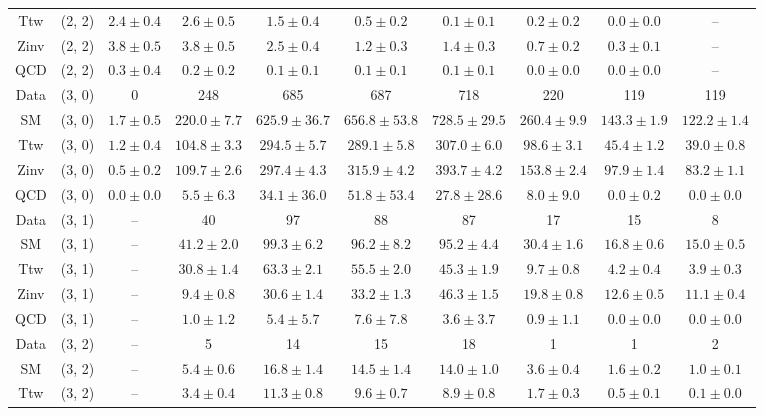 \begin{table}[h!]
{\begin{tabular}{cccccccccc}
	Ttw & (2, 2) & $2.4\pm 0.4$ & $2.6\pm 0.5$ & $1.5\pm 0.4$ & $0.5\pm 0.2$ & $0.1\pm 0.1$ & $0.2\pm 0.2$ & $0.0\pm 0.0$ & -- \\[0.5ex] 
	Zinv & (2, 2) & $3.8\pm 0.5$ & $3.8\pm 0.5$ & $2.5\pm 0.4$ & $1.2\pm 0.3$ & $1.4\pm 0.3$ & $0.7\pm 0.2$ & $0.3\pm 0.1$ & -- \\[0.5ex] 
	QCD & (2, 2) & $0.3\pm 0.4$ & $0.2\pm 0.2$ & $0.1\pm 0.1$ & $0.1\pm 0.1$ & $0.1\pm 0.1$ & $0.0\pm 0.0$ & $0.0\pm 0.0$ & -- \\[0.5ex] 
	Data & (3, 0) & 0 & 248 & 685 & 687 & 718 & 220 & 119 & 119 \\[0.5ex] 
	SM & (3, 0) & $1.7\pm 0.5$ & $220.0\pm 7.7$ & $625.9\pm 36.7$ & $656.8\pm 53.8$ & $728.5\pm 29.5$ & $260.4\pm 9.9$ & $143.3\pm 1.9$ & $122.2\pm 1.4$ \\[0.5ex] 
	Ttw & (3, 0) & $1.2\pm 0.4$ & $104.8\pm 3.3$ & $294.5\pm 5.7$ & $289.1\pm 5.8$ & $307.0\pm 6.0$ & $98.6\pm 3.1$ & $45.4\pm 1.2$ & $39.0\pm 0.8$ \\[0.5ex] 
	Zinv & (3, 0) & $0.5\pm 0.2$ & $109.7\pm 2.6$ & $297.4\pm 4.3$ & $315.9\pm 4.2$ & $393.7\pm 4.2$ & $153.8\pm 2.4$ & $97.9\pm 1.4$ & $83.2\pm 1.1$ \\[0.5ex] 
	QCD & (3, 0) & $0.0\pm 0.0$ & $5.5\pm 6.3$ & $34.1\pm 36.0$ & $51.8\pm 53.4$ & $27.8\pm 28.6$ & $8.0\pm 9.0$ & $0.0\pm 0.2$ & $0.0\pm 0.0$ \\[0.5ex] 
	Data & (3, 1) & -- & 40 & 97 & 88 & 87 & 17 & 15 & 8 \\[0.5ex] 
	SM & (3, 1) & -- & $41.2\pm 2.0$ & $99.3\pm 6.2$ & $96.2\pm 8.2$ & $95.2\pm 4.4$ & $30.4\pm 1.6$ & $16.8\pm 0.6$ & $15.0\pm 0.5$ \\[0.5ex] 
	Ttw & (3, 1) & -- & $30.8\pm 1.4$ & $63.3\pm 2.1$ & $55.5\pm 2.0$ & $45.3\pm 1.9$ & $9.7\pm 0.8$ & $4.2\pm 0.4$ & $3.9\pm 0.3$ \\[0.5ex] 
	Zinv & (3, 1) & -- & $9.4\pm 0.8$ & $30.6\pm 1.4$ & $33.2\pm 1.3$ & $46.3\pm 1.5$ & $19.8\pm 0.8$ & $12.6\pm 0.5$ & $11.1\pm 0.4$ \\[0.5ex] 
	QCD & (3, 1) & -- & $1.0\pm 1.2$ & $5.4\pm 5.7$ & $7.6\pm 7.8$ & $3.6\pm 3.7$ & $0.9\pm 1.1$ & $0.0\pm 0.0$ & $0.0\pm 0.0$ \\[0.5ex] 
	Data & (3, 2) & -- & 5 & 14 & 15 & 18 & 1 & 1 & 2 \\[0.5ex] 
	SM & (3, 2) & -- & $5.4\pm 0.6$ & $16.8\pm 1.4$ & $14.5\pm 1.4$ & $14.0\pm 1.0$ & $3.6\pm 0.4$ & $1.6\pm 0.2$ & $1.0\pm 0.1$ \\[0.5ex] 
	Ttw & (3, 2) & -- & $3.4\pm 0.4$ & $11.3\pm 0.8$ & $9.6\pm 0.7$ & $8.9\pm 0.8$ & $1.7\pm 0.3$ & $0.5\pm 0.1$ & $0.1\pm 0.0$ \\[0.5ex] 

\end{tabular}}
\end{table}
